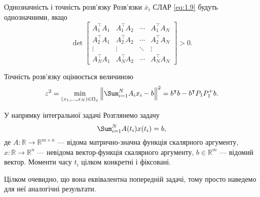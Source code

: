 \begin{mframe}{Однозначність і точність розв'язку}
    Розв'язки $\bar x_i$ СЛАР \eqref{eq:1.9} будуть однозначними, якщо
    \begin{equation}
        \label{eq:1.13}
        \det \begin{bmatrix}
            A_1^\intercal A_1 & A_1^\intercal A_2 & \cdots & A_1^\intercal A_N\\
            A_2^\intercal A_1 & A_2^\intercal A_2 & \cdots & A_2^\intercal A_N\\
            \vdots & \vdots & \ddots & \vdots \\
            A_N^\intercal A_1 & A_N^\intercal A_2 & \cdots & A_N^\intercal A_N
        \end{bmatrix} > 0.
    \end{equation}

    Точність розв'язку оцінюється величиною
    \begin{equation}
        \label{eq:1.15}
        \varepsilon^2 = \min_{(x_1, \ldots, x_N) \in \Omega_x}
        \left\| \Sum_{i = 1}^N A_i x_i - b \right\|^2 =
        b^\intercal b - b^\intercal P_1 P_1^+ b.
    \end{equation}
\end{mframe}

\begin{mframe}{У напрямку інтегральної задачі}
    Розглянемо задачу
    \begin{equation}
        \label{eq:1.16}
        \Sum_{i = 1}^N A(t_i) x(t_i) = b,
    \end{equation}
    де $A: \mathbb{R} \to \mathbb{R}^{m \times n}$ --- відома матрично-значна
    функція скалярного аргументу, $x: \mathbb{R} \to \mathbb{R}^n$ --- невідома
    вектор-функція скалярного аргументу, $b \in \mathbb{R}^m$ --- відомий
    вектор. Моменти часу $t_i$ цілком конкретні і фіксовані. \medskip
    
    Цілком очевидно, що вона еквівалентна попередній задачі, тому просто
    наведемо для неї аналогічні результати.
\end{mframe}

